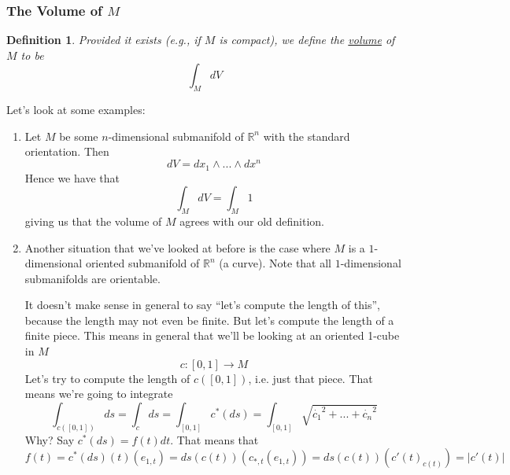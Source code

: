 \documentclass{article}
\newtheorem{definition}{Definition}
\newcommand{\reals}[0]{\mathbb{R}}
\begin{document}
\subsubsection{The Volume of \(M\)}
\begin{definition}
  Provided it exists (e.g., if \(M\) is compact), we define the \underline{volume} of \(M\) to be
  \begin{equation}
    \int_MdV
  \end{equation}
\end{definition}
Let's look at some examples:
\begin{enumerate}

  \item Let \(M\) be some \(n\)-dimensional submanifold of \(\reals^n\) with the standard orientation. Then
  \begin{equation}
    dV = dx_1 \wedge ... \wedge dx^n
  \end{equation}
  Hence we have that
  \begin{equation}
    \int_MdV = \int_M1
  \end{equation}
  giving us that the volume of \(M\) agrees with our old definition.

  \item Another situation that we've looked at before is the case where \(M\) is a \(1\)-dimensional oriented submanifold of \(\reals^n\) (a curve). Note that all \(1\)-dimensional submanifolds are orientable.

  It doesn't make sense in general to say ``let's compute the length of this'', because the length may not even be finite. But let's compute the length of a finite piece. This means in general that we'll be looking at an oriented 1-cube in \(M\)
  \begin{equation}
    c: [0, 1] \to M
  \end{equation}
  Let's try to compute the length of \(c([0, 1])\), i.e. just that piece. That means we're going to integrate
  \begin{equation}
    \int_{c([0, 1])}ds = \int_{c}ds = \int_{[0, 1]}c^*(ds) = \int_{[0, 1]}\sqrt{\dot{c_1}^2 + ... + \dot{c_n}^2}
  \end{equation}
  Why? Say \(c^*(ds) = f(t)dt\). That means that
  \begin{equation}
    f(t) = c^*(ds)(t)(e_{1, t}) = ds(c(t))(c_{*,t}(e_{1, t})) = ds(c(t))(c'(t)_{c(t)}) = |c'(t)|
  \end{equation}


\end{enumerate}
\end{document}

